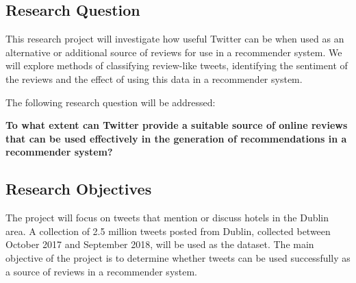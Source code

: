 \subsection{Research Question}
This research project will investigate how useful Twitter can be when used as an alternative or additional source of reviews for use in a recommender system. We will explore methods of classifying review-like tweets, identifying the sentiment of the reviews and the effect of using this data in a recommender system.

The following research question will be addressed:
\begin{center}
\textbf{To what extent can Twitter provide a suitable source of online reviews that can be used effectively in the generation of recommendations in a recommender system?}
\end{center}

\subsection{Research Objectives}
The project will focus on tweets that mention or discuss hotels in the Dublin area. A collection of 2.5 million tweets posted from Dublin, collected between October 2017 and September 2018, will be used as the dataset. The main objective of the project is to determine whether tweets can be used successfully as a source of reviews in a recommender system.

